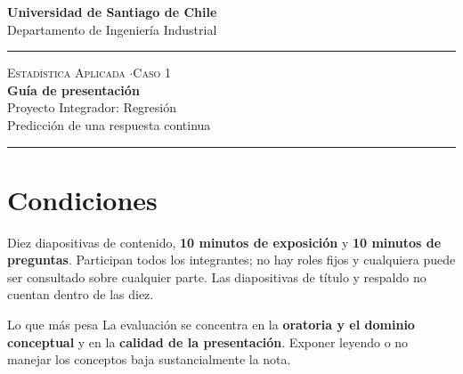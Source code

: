 \documentclass[11pt,letterpaper]{article}
\newcommand{\hrulethin}{\noindent\rule{\textwidth}{0.6pt}}
\begin{document}
\pagestyle{plain}
\begin{center}
    \textbf{\large Universidad de Santiago de Chile}\\[0.1cm]
    Departamento de Ingeniería Industrial
\end{center}
\vspace{0.15cm}\hrulethin\vspace{0.35cm}
\begin{center}
    {\scshape Estadística Aplicada \quad$\cdot$\quad Caso 1}\\[0.35cm]
    {\LARGE \textbf{Guía de presentación}}\\[0.15cm]
    {\large Proyecto Integrador: Regresión}\\[0.2cm]
    Predicción de una respuesta continua
\end{center}
\vspace{0.2cm}\hrulethin\vspace{0.4cm}
\section*{Condiciones}
Diez diapositivas de contenido, \textbf{10 minutos de exposición} y \textbf{10 minutos de preguntas}. Participan
todos los integrantes; no hay roles fijos y cualquiera puede ser consultado sobre cualquier parte. Las
diapositivas de título y respaldo no cuentan dentro de las diez.

\begin{alertbox}{Lo que más pesa}
La evaluación se concentra en la \textbf{oratoria y el dominio conceptual} y en la \textbf{calidad de la presentación}. Exponer leyendo o no manejar los conceptos baja sustancialmente la nota.
\end{alertbox}
\end{document}

